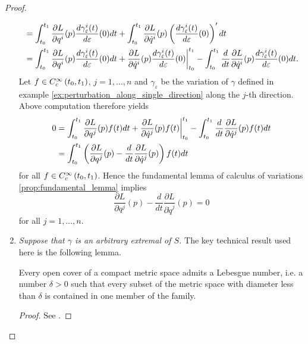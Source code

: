 \begin{proof}
\begin{enumerate}[label = \textit{Step \arabic*:},wide=0pt]
\begin{align*}
				&= \int_{t_0}^{t_1} \frac{\partial L}{\partial q^i}(p)\frac{d\gamma_\varepsilon^i(t)}{d\varepsilon}(0)dt + \int_{t_0}^{t_1}\frac{\partial L}{\partial \dot{q}^i}(p)\del[3]{\frac{d\gamma_\varepsilon^i(t)}{d\varepsilon}(0)}'dt\\
				&= \int_{t_0}^{t_1} \frac{\partial L}{\partial q^i}(p)\frac{d\gamma_\varepsilon^i(t)}{d\varepsilon}(0)dt + \frac{\partial L}{\partial \dot{q}^i}(p)\frac{d\gamma_\varepsilon^i(t)}{d\varepsilon}(0)\bigg\vert_{t_0}^{t_1} - \int_{t_0}^{t_1} \frac{d}{dt}\frac{\partial L}{\partial \dot{q}^i}(p)\frac{d\gamma_\varepsilon^i(t)}{d\varepsilon}(0)dt.	
			\end{align*}
			\noindent Let $f \in C^\infty_c\intoo[0]{t_0,t_1}$, $j = 1,\dots,n$ and $\gamma_\varepsilon$ be the variation of $\gamma$ defined in example \ref{ex:perturbation_along_single_direction} along the $j$-th direction. Above computation therefore yields
			\begin{align*}
				0 &= \int_{t_0}^{t_1} \frac{\partial L}{\partial q^j}(p)f(t)dt + \frac{\partial L}{\partial \dot{q}^j}(p)f(t)\bigg\vert_{t_0}^{t_1} - \int_{t_0}^{t_1} \frac{d}{dt}\frac{\partial L}{\partial \dot{q}^j}(p)f(t)dt\\
				&= \int_{t_0}^{t_1} \del[3]{\frac{\partial L}{\partial q^j}(p) - \frac{d}{dt}\frac{\partial L}{\partial \dot{q}^j}(p)}f(t) dt
			\end{align*}
			\noindent for all $f \in C^\infty_c\intoo[0]{t_0,t_1}$. Hence the fundamental lemma of calculus of variations \ref{prop:fundamental_lemma} implies
			\begin{equation*}
				\frac{\partial L}{\partial q^j}(p) - \frac{d}{dt}\frac{\partial L}{\partial \dot{q}^j}(p) = 0
			\end{equation*}
			\noindent for all $j = 1,\dots,n$.
		\item \textit{Suppose that $\gamma$ is an arbitrary extremal of $S$.} The key technical result used here is the following lemma.
			\begin{lemma}
				\label{lem:Lebesgue_number_lemma}
				Every open cover of a compact metric space admits a Lebesgue number, i.e. a number $\delta > 0$ such that every subset of the metric space with diameter less than $\delta$ is contained in one member of the family.
			\end{lemma}

			\begin{proof}
				See \cite[194]{lee:topological_manifolds:2011}.
			\end{proof}


\end{enumerate}
\end{proof}
